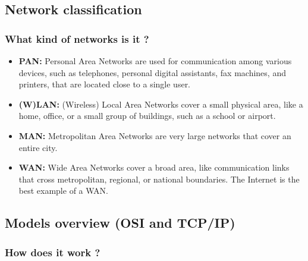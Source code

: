 \subsection{Network classification}
  \begin{frame}
    \frametitle{What kind of networks is it ?}
      \begin{itemize}
        \item \textbf{PAN:} Personal Area Networks are used for communication among various devices, such as telephones, personal digital assistants, fax machines, and printers, that are located close to a single user.
        \item \textbf{(W)LAN:} (Wireless) Local Area Networks cover a small physical area, like a home, office, or a small group of buildings, such as a school or airport.
        \item \textbf{MAN:} Metropolitan Area Networks are very large networks that cover an entire city.
        \item \textbf{WAN:} Wide Area Networks cover a broad area, like communication links that cross metropolitan, regional, or national boundaries. The Internet is the best example of a WAN.
      \end{itemize}
  \end{frame}


\subsection{Models overview (OSI and TCP/IP)}
  \begin{frame}
    \frametitle{How does it work ?}
  \end{frame}